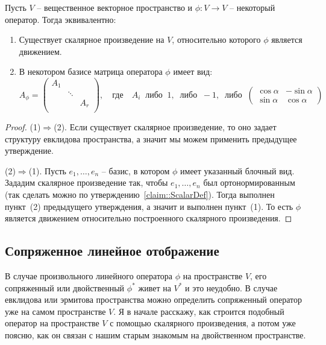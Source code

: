 \begin{claim}
Пусть $V$ -- вещественное векторное пространство и $\phi\colon V\to V$ -- некоторый оператор. Тогда эквивалентно:
\begin{enumerate}
\item Существует скалярное произведение на $V$, относительно которого $\phi$ является движением.
\item В некотором базисе матрица оператора $\phi$ имеет вид:
\[
A_\phi=
\begin{pmatrix}
{A_1}&{}&{}\\
{}&{\ddots}&{}\\
{}&{}&{A_r}\\
\end{pmatrix},
\quad\text{где}\quad
A_i\;\;\text{либо}\;\;1,\;\;\text{либо}\;\;-1,\;\;\text{либо}\;\;
\begin{pmatrix}
{\cos \alpha}&{-\sin\alpha}\\
{\sin\alpha}&{\cos\alpha}
\end{pmatrix}
\]
\end{enumerate}
\end{claim}
\begin{proof}
(1)$\Rightarrow$(2). Если существует скалярное произведение, то оно задает структуру евклидова пространства, а значит мы можем применить предыдущее утверждение.

(2)$\Rightarrow$(1). Пусть $e_1,\ldots,e_n$ -- базис, в котором $\phi$ имеет указанный блочный вид. Зададим скалярное произведение так, чтобы $e_1,\ldots,e_n$ был ортонормированным (так сделать можно по утверждению~\ref{claim::ScalarDef}). Тогда выполнен пункт~(2) предыдущего утверждения, а значит и выполнен пункт~(1). То есть $\phi$ является движением относительно построенного скалярного произведения.
\end{proof}


\subsection{Сопряженное линейное отображение}

В случае произвольного линейного оператора $\phi$ на пространстве $V$, его сопряженный или двойственный $\phi^*$ живет на $V^*$ и это неудобно. В случае евклидова или эрмитова пространства можно определить сопряженный оператор уже на самом пространстве $V$. Я в начале расскажу, как строится подобный оператор на пространстве $V$ с помощью скалярного произведения, а потом уже поясню, как он связан с нашим старым знакомым на двойственном пространстве.

